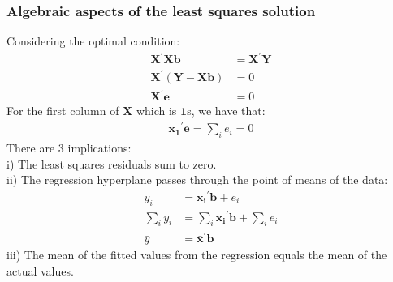 \documentclass{article}
\begin{document}
\subsubsection{Algebraic aspects of the least squares solution}
Considering the optimal condition:
	\begin{align*}
		\boldsymbol{X}^\prime \boldsymbol{X} \boldsymbol{b} &= \boldsymbol{X}^\prime \boldsymbol{Y}\\
		\boldsymbol{X}^\prime (\boldsymbol{Y} - \boldsymbol{X} \boldsymbol{b}) &= 0\\
		\boldsymbol{X}^\prime \boldsymbol{e} &= 0
	\end{align*}
For the first column of $\boldsymbol{X}$ which is $\boldsymbol{1}$s, we have that:
	\begin{align*}
		\boldsymbol{x_1}^\prime \boldsymbol{e} = \sum_i e_i = 0
	\end{align*}
There are 3 implications:\\
\indent i) The least squares residuals sum to zero.\\
\indent ii) The regression hyperplane passes through the point of means of the data:
	\begin{align*}
		y_i &= \boldsymbol{x_i}^\prime \boldsymbol{b} + e_i\\
		\sum_i y_i &= \sum_i \boldsymbol{x_i}^\prime \boldsymbol{b} + \sum_i e_i\\
		\bar{y} &= \bar{\boldsymbol{x}}^\prime \boldsymbol{b}
	\end{align*}
\indent iii) The mean of the fitted values from the regression equals the mean of the actual values.
\end{document}
